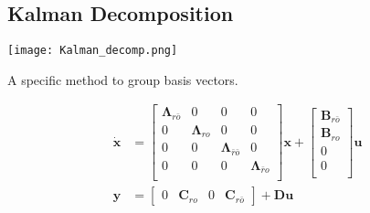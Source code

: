 \subsection{Kalman Decomposition}
\begin{center}
    \texttt{[image: Kalman\_decomp.png]}
\end{center}
A specific method to group basis vectors.

\newpar{}
\begin{align*}
    \dot{\mathbf{x}} & = \begin{bmatrix}
                             \bm{\Lambda}_{r\bar{o}} & 0                 & 0                             & 0                       \\
                             0                       & \bm{\Lambda}_{ro} & 0                             & 0                       \\
                             0                       & 0                 & \bm{\Lambda}_{\bar{r}\bar{o}} & 0                       \\
                             0                       & 0                 & 0                             & \bm{\Lambda}_{\bar{r}o} \\
                         \end{bmatrix}
    \mathbf{x} + \begin{bmatrix}
                     \mathbf{B}_{r\bar{o}} \\
                     \mathbf{B}_{ro}       \\
                     0                     \\
                     0                     \\
                 \end{bmatrix}
    \mathbf{u}                                                                                                                 \\
    \mathbf{y}       & = \begin{bmatrix}
                             0 & \mathbf{C}_{ro} & 0 & \mathbf{C}_{r\bar{o}}
                         \end{bmatrix}
    + \mathbf{Du}
\end{align*}

